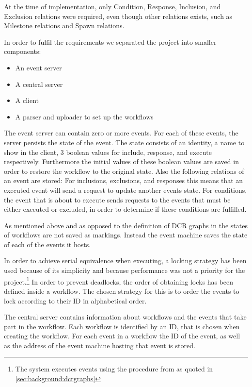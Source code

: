 		\newpar At the time of implementation, only Condition, Response, Inclusion, and Exclusion relations were required, even though other relations exists, such as Milestone relations and Spawn relations. 
		
		\newpar In order to fulfil the requirements we separated the project into smaller components:
		
		\begin{itemize}
			\item An event server
			\item A central server
			\item A client
			\item A parser and uploader to set up the workflows
		\end{itemize}
		
		\newpar The event server can contain zero or more events. For each of these events, the server persists the state of the event. The state consists of an identity, a name to show in the client, 3 boolean values for include, response, and execute respectively. Furthermore the initial values of these boolean values are saved in order to restore the workflow to the original state. Also the following relations of an event are stored: For inclusions, exclusions, and responses this means that an executed event will send a request to update another events state. For conditions, the event that is about to execute sends requests to the events that must be either executed or excluded, in order to determine if these conditions are fulfilled.
		
		As mentioned above and as opposed to the definition of DCR graphs in \cite{hildebrandt2011declarative} the states of workflows are not saved as markings. Instead the event machine saves the state of each of the events it hosts.
		
		\newpar In order to achieve serial equivalence when executing, a locking strategy has been used because of its simplicity and because performance was not a priority for the project.\footnote{The system executes events using the procedure from \cite{debois2015concurrency} as quoted in \autoref{sec:background:dcrgraphs}} In order to prevent deadlocks, the order of obtaining locks has been defined inside a workflow. The chosen strategy for this is to order the events to lock according to their ID in alphabetical order.
		
		\newpar The central server contains information about workflows and the events that take part in the workflow. Each workflow is identified by an ID, that is chosen when creating the workflow. For each event in a workflow the ID of the event, as well as the address of the event machine hosting that event is stored.
		
